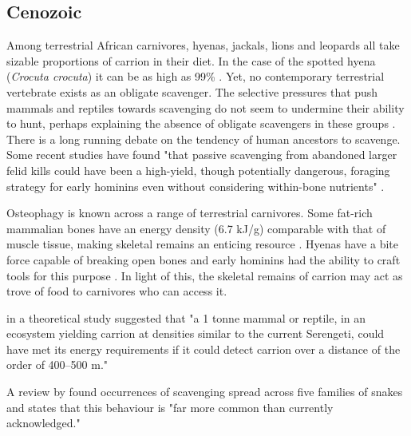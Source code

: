 \documentclass[a4paper,12pt]{article}
\begin{document}
\subsection*{Cenozoic}
Among terrestrial African carnivores, hyenas, jackals, lions and leopards all take sizable proportions of carrion in their diet.
In the case of the spotted hyena (\textit{Crocuta crocuta}) it can be as high as 99\% \citep{benbow2015introduction}. 
Yet, no contemporary terrestrial vertebrate exists as an obligate scavenger. 
The selective pressures that push mammals and reptiles towards scavenging do not seem to undermine their ability to hunt, perhaps explaining the absence of obligate scavengers in these groups \citep{ruxton2004obligate}.
\\There is a long running debate on the tendency of human ancestors to scavenge. 
Some recent studies have found "that passive scavenging from abandoned larger felid kills could have been a high-yield, though potentially dangerous, foraging strategy for early hominins even without considering within-bone nutrients" \citep{pobiner2015new}. 

Osteophagy is known across a range of terrestrial carnivores.
Some fat-rich mammalian bones have an energy density (6.7 kJ/g) comparable with that of muscle tissue, making skeletal remains an enticing resource \citep{brown1989study}. 
Hyenas have a bite force capable of breaking open bones and early hominins had the ability to craft tools for this purpose \citep{hone2010feeding,ARCM:ARCM12084}. 
In light of this, the skeletal remains of carrion may act as trove of food to carnivores who can access it.  

\cite{ruxton2004obligate} in a theoretical study suggested that "a 1 tonne mammal or reptile, in an ecosystem yielding carrion at densities similar to the current Serengeti, could have met its energy requirements if it could detect carrion over a distance of the order of 400–500 m."

A review by \cite{devault2002scavenging} found occurrences of scavenging spread across five families of snakes and states that this behaviour is "far more common than currently acknowledged."
\end{document}
